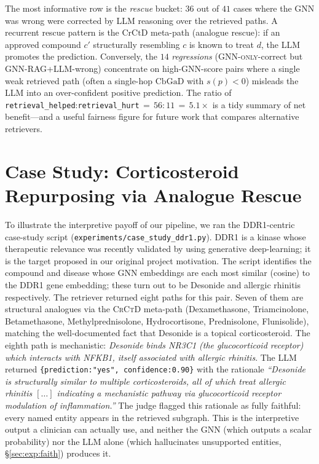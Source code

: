 \documentclass{article}
\newcommand{\ours}{\textsc{GNN-RAG+LLM}\xspace}
\newcommand{\gnno}{\textsc{GNN-only}\xspace}
\begin{document}
The most informative row is the \emph{rescue} bucket: $36$ out of $41$ cases where the GNN was wrong were corrected by LLM reasoning over the retrieved paths. A recurrent rescue pattern is the $\text{CrCtD}$ meta-path (analogue rescue): if an approved compound $c'$ structurally resembling $c$ is known to treat $d$, the LLM promotes the prediction. Conversely, the $14$ \emph{regressions} (\gnno-correct but \ours-wrong) concentrate on high-GNN-score pairs where a single weak retrieved path (often a single-hop $\text{CbGaD}$ with $s(p){<}0$) misleads the LLM into an over-confident positive prediction. The ratio of \texttt{retrieval\_helped}:\texttt{retrieval\_hurt}$\,=\,56{:}11\,=\,5.1{\times}$ is a tidy summary of net benefit---and a useful fairness figure for future work that compares alternative retrievers.

\section{Case Study: Corticosteroid Repurposing via Analogue Rescue}
\label{sec:case}

To illustrate the interpretive payoff of our pipeline, we ran the DDR1-centric case-study script (\texttt{experiments/case\_study\_ddr1.py}). DDR1 is a kinase whose therapeutic relevance was recently validated by \citet{zhavoronkov2019ddr1} using generative deep-learning; it is the target proposed in our original project motivation. The script identifies the compound and disease whose GNN embeddings are each most similar (cosine) to the DDR1 gene embedding; these turn out to be Desonide and allergic rhinitis respectively. The retriever returned eight paths for this pair. Seven of them are structural analogues via the \textsc{CrCtD} meta-path (Dexamethasone, Triamcinolone, Betamethasone, Methylprednisolone, Hydrocortisone, Prednisolone, Flunisolide), matching the well-documented fact that Desonide is a topical corticosteroid. The eighth path is mechanistic: \emph{Desonide binds NR3C1 (the glucocorticoid receptor) which interacts with NFKB1, itself associated with allergic rhinitis}. The LLM returned \texttt{\{prediction:"yes", confidence:0.90\}} with the rationale \emph{``Desonide is structurally similar to multiple corticosteroids, all of which treat allergic rhinitis $[\ldots]$ indicating a mechanistic pathway via glucocorticoid receptor modulation of inflammation.''} The judge flagged this rationale as fully faithful: every named entity appears in the retrieved subgraph. This is the interpretive output a clinician can actually use, and neither the GNN (which outputs a scalar probability) nor the LLM alone (which hallucinates unsupported entities, \S\ref{sec:exp:faith}) produces it.
\end{document}
